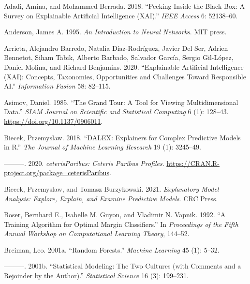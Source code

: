 \documentclass[11pt,twoside]{article}
\newlength{\cslhangindent}
\newlength{\cslentryspacingunit} %
\newenvironment{CSLReferences}[2] %
 {%
  \setlength{\parindent}{0pt}
  \ifodd #1
  \let\oldpar\par
  \def\par{\hangindent=\cslhangindent\oldpar}
  \fi
  \setlength{\parskip}{#2\cslentryspacingunit}
 }%
 {}
\begin{document}
\hypertarget{refs}{}
\begin{CSLReferences}{1}{0}
\leavevmode\hypertarget{ref-adadi_peeking_2018}{}%
Adadi, Amina, and Mohammed Berrada. 2018. {``Peeking Inside the Black-Box: A Survey on Explainable Artificial Intelligence ({XAI}).''} \emph{IEEE Access} 6: 52138--60.

\leavevmode\hypertarget{ref-anderson_introduction_1995}{}%
Anderson, James A. 1995. \emph{An Introduction to Neural Networks}. MIT press.

\leavevmode\hypertarget{ref-arrieta_explainable_2020}{}%
Arrieta, Alejandro Barredo, Natalia Díaz-Rodríguez, Javier Del Ser, Adrien Bennetot, Siham Tabik, Alberto Barbado, Salvador García, Sergio Gil-López, Daniel Molina, and Richard Benjamins. 2020. {``Explainable {Artificial} {Intelligence} ({XAI}): {Concepts}, Taxonomies, Opportunities and Challenges Toward Responsible {AI}.''} \emph{Information Fusion} 58: 82--115.

\leavevmode\hypertarget{ref-asimov_grand_1985}{}%
Asimov, Daniel. 1985. {``The {Grand} {Tour}: A {Tool} for {Viewing} {Multidimensional} {Data}.''} \emph{SIAM Journal on Scientific and Statistical Computing} 6 (1): 128--43. \url{https://doi.org/10.1137/0906011}.

\leavevmode\hypertarget{ref-biecek_dalex_2018}{}%
Biecek, Przemyslaw. 2018. {``{DALEX}: Explainers for Complex Predictive Models in {R}.''} \emph{The Journal of Machine Learning Research} 19 (1): 3245--49.

\leavevmode\hypertarget{ref-biecek_ceterisparibus_2020}{}%
---------. 2020. \emph{{ceterisParibus}: {Ceteris} {Paribus} {Profiles}}. \url{https://CRAN.R-project.org/package=ceterisParibus}.

\leavevmode\hypertarget{ref-biecek_explanatory_2021}{}%
Biecek, Przemyslaw, and Tomasz Burzykowski. 2021. \emph{Explanatory {Model} {Analysis}: {Explore}, {Explain}, and {Examine} {Predictive} {Models}}. CRC Press.

\leavevmode\hypertarget{ref-boser_training_1992}{}%
Boser, Bernhard E., Isabelle M. Guyon, and Vladimir N. Vapnik. 1992. {``A Training Algorithm for Optimal Margin Classifiers.''} In \emph{Proceedings of the Fifth Annual Workshop on {Computational} Learning Theory}, 144--52.

\leavevmode\hypertarget{ref-breiman_random_2001}{}%
Breiman, Leo. 2001a. {``Random Forests.''} \emph{Machine Learning} 45 (1): 5--32.

\leavevmode\hypertarget{ref-breiman_statistical_2001}{}%
---------. 2001b. {``Statistical Modeling: {The} Two Cultures (with Comments and a Rejoinder by the Author).''} \emph{Statistical Science} 16 (3): 199--231.


\end{CSLReferences}
\end{document}
